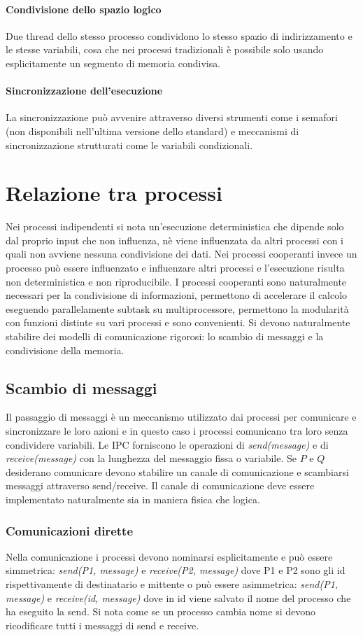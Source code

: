 \paragraph{Condivisione dello spazio logico}
Due thread dello stesso processo condividono lo stesso spazio di indirizzamento e le stesse variabili, cosa che nei processi tradizionali \`e possibile solo usando esplicitamente un
segmento di memoria condivisa. 
\paragraph{Sincronizzazione dell'esecuzione}
La sincronizzazione pu\`o avvenire attraverso diversi strumenti come i semafori (non disponibili nell'ultima versione dello standard) e meccanismi di sincronizzazione strutturati come
le variabili condizionali. 
\section{Relazione tra processi}
Nei processi indipendenti si nota un'esecuzione deterministica che dipende solo dal proprio input che non influenza, n\`e viene influenzata da altri processi con i quali non avviene
nessuna condivisione dei dati. Nei processi cooperanti invece un processo pu\`o essere influenzato e influenzare altri processi e l'esecuzione risulta non deterministica e non 
riproducibile. I processi cooperanti sono naturalmente necessari per la condivisione di informazioni, permettono di accelerare il calcolo eseguendo parallelamente subtask su 
multiprocessore, permettono la modularit\`a con funzioni distinte su vari processi e sono convenienti. Si devono naturalmente stabilire dei modelli di comunicazione rigorosi: lo scambio
di messaggi e la condivisione della memoria.
\subsection{Scambio di messaggi}
Il passaggio di messaggi \`e un meccanismo utilizzato dai processi per comunicare e sincronizzare le loro azioni e in questo caso i processi comunicano tra loro senza condividere 
variabili. Le IPC forniscono le operazioni di \emph{send(message)} e di \emph{receive(message)} con la lunghezza del messaggio fissa o variabile. Se $P$ e $Q$ desiderano comunicare 
devono stabilire un canale di comunicazione e scambiarsi messaggi attraverso send/receive. Il canale di comunicazione deve essere implementato naturalmente sia in maniera fisica che
logica. 
\subsubsection{Comunicazioni dirette}
Nella comunicazione i processi devono nominarsi esplicitamente e pu\`o essere simmetrica: \emph{send(P1, message)} e \emph{receive(P2, message)} dove P1 e P2 sono gli id rispettivamente
di destinatario e mittente o pu\`o essere asimmetrica: \emph{send(P1, message)} e \emph{receive(id, message)} dove in id viene salvato il nome del processo che ha eseguito la send. Si
nota come se un processo cambia nome si devono ricodificare tutti i messaggi di send e receive.
